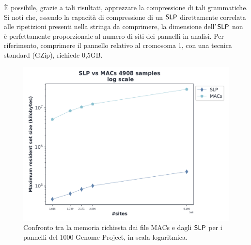 È possibile, grazie a tali risultati, apprezzare la compressione di tali
grammatiche.  
Si noti che, essendo la capacità di compressione di un $\mbox{\rm {\sf SLP}}$
direttamente correlata alle ripetizioni presenti nella stringa da comprimere, la
dimensione dell'$\,\mbox{\rm {\sf SLP}}$ non è perfettamente proporzionale al numero di siti
dei pannelli in analisi. Per riferimento, comprimere il pannello relativo al
cromosoma 1, con una tecnica standard (GZip), richiede 0,5GB.
\begin{figure}
  \centering
  \includegraphics[width=0.7\linewidth]{img/slp_vs_macs_log.png}
  \caption{Confronto tra la memoria richiesta dai file MACs e dagli $\mbox{\rm {\sf SLP}}$ per i
    pannelli del 1000 Genome Project, in scala
    logaritmica.} 
  \label{fig:slpmacschr}
\end{figure}

